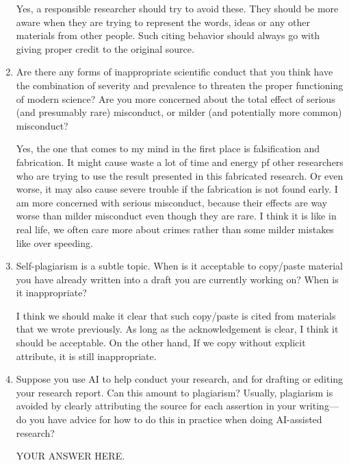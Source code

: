 \documentclass[12pt]{article}
\begin{document}
\begin{enumerate}
Yes, a responsible researcher should try to avoid these. They should be more aware when they are trying to represent the words, ideas or any other materials from other people. Such citing behavior should always go with giving proper credit to the original source.

\item Are there any forms of inappropriate scientific conduct that you think have the combination of severity and prevalence to threaten the proper functioning of modern science? Are you more concerned about the total effect of serious (and presumably rare) misconduct, or milder (and potentially more common) misconduct?

Yes, the one that comes to my mind in the first place is falsification and fabrication. It might cause waste a lot of time and energy pf other researchers who are trying to use the result presented in this fabricated research. Or even worse, it may also cause severe trouble if the fabrication is not found early. I am more concerned with serious misconduct, because their effects are way worse than milder misconduct even though they are rare. I think it is like in real life, we often care more about crimes rather than some milder mistakes like over speeding.

\item Self-plagiarism is a subtle topic. When is it acceptable to copy/paste material you have already written into a draft you are currently working on? When is it inappropriate?

I think we should make it clear that such copy/paste is cited from materials that we wrote previously.
As long as the acknowledgement is clear, I think it should be acceptable. On the other hand, If we copy without explicit attribute, it is still inappropriate.

\item Suppose you use AI to help conduct your research, and for drafting or editing your research report. Can this amount to plagiarism? Usually, plagiarism is avoided by clearly attributing the source for each assertion in your writing---do you have advice for how to do this in practice when doing AI-assisted research?

YOUR ANSWER HERE.

\end{enumerate}
\end{document}
